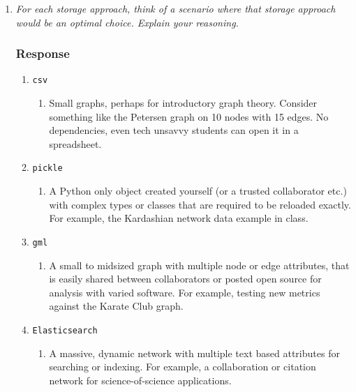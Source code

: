 \documentclass{article}
\newcommand{\response}{\subsubsection*{Response}}
\begin{document}
\begin{enumerate}
    For Elasticsearch, any misconfigured database access protocol is a potential security vulnerability. 
    \item \textit{For each storage approach, think of a scenario where that storage approach would be an optimal choice. Explain your reasoning.}
    \response
    \begin{enumerate}
        \item[] \texttt{csv}
        \begin{enumerate}
            \item Small graphs, perhaps for introductory graph theory. Consider something like the Petersen graph on 10 nodes with 15 edges. No dependencies, even tech unsavvy students can open it in a spreadsheet. 
        \end{enumerate}
        \item[] \texttt{pickle}
        \begin{enumerate}
            \item A Python only object created yourself (or a trusted collaborator etc.) with complex types or classes that are required to be reloaded exactly. For example, the Kardashian network data example in class. 
        \end{enumerate}
        \item[] \texttt{gml}
        \begin{enumerate}
            \item A small to midsized graph with multiple node or edge attributes, that is easily shared between collaborators or posted open source for analysis with varied software. For example, testing new metrics against the Karate Club graph. 
        \end{enumerate}
        \item[] \texttt{Elasticsearch}
        \begin{enumerate}
            \item A massive, dynamic network with multiple text based attributes for searching or indexing. For example, a collaboration or citation network for science-of-science applications.
        \end{enumerate}
    \end{enumerate}
\end{enumerate}




\clearpage
\section{}
\end{document}
